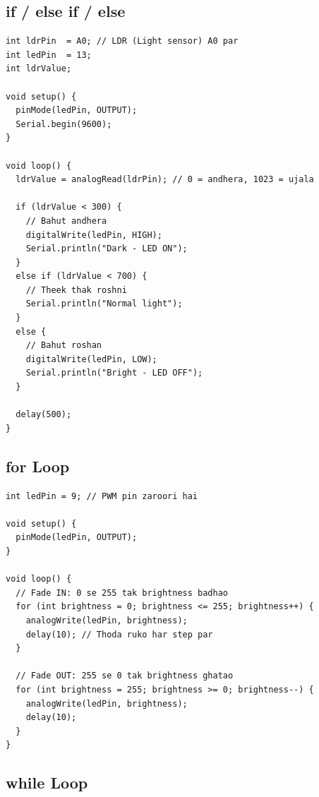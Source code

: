 \documentclass[12pt,a4paper]{article}
\begin{document}
\subsection{if / else if / else}

\begin{tcolorbox}[codebox=Example 11: Light Sensor se Automatic LED]
\begin{lstlisting}
int ldrPin  = A0; // LDR (Light sensor) A0 par
int ledPin  = 13;
int ldrValue;

void setup() {
  pinMode(ledPin, OUTPUT);
  Serial.begin(9600);
}

void loop() {
  ldrValue = analogRead(ldrPin); // 0 = andhera, 1023 = ujala

  if (ldrValue < 300) {
    // Bahut andhera
    digitalWrite(ledPin, HIGH);
    Serial.println("Dark - LED ON");
  }
  else if (ldrValue < 700) {
    // Theek thak roshni
    Serial.println("Normal light");
  }
  else {
    // Bahut roshan
    digitalWrite(ledPin, LOW);
    Serial.println("Bright - LED OFF");
  }

  delay(500);
}
\end{lstlisting}
\end{tcolorbox}

\subsection{for Loop}

\begin{tcolorbox}[codebox=Example 12: for Loop se LED Fade In/Out]
\begin{lstlisting}
int ledPin = 9; // PWM pin zaroori hai

void setup() {
  pinMode(ledPin, OUTPUT);
}

void loop() {
  // Fade IN: 0 se 255 tak brightness badhao
  for (int brightness = 0; brightness <= 255; brightness++) {
    analogWrite(ledPin, brightness);
    delay(10); // Thoda ruko har step par
  }

  // Fade OUT: 255 se 0 tak brightness ghataо
  for (int brightness = 255; brightness >= 0; brightness--) {
    analogWrite(ledPin, brightness);
    delay(10);
  }
}
\end{lstlisting}
\end{tcolorbox}

\subsection{while Loop}
\end{document}
